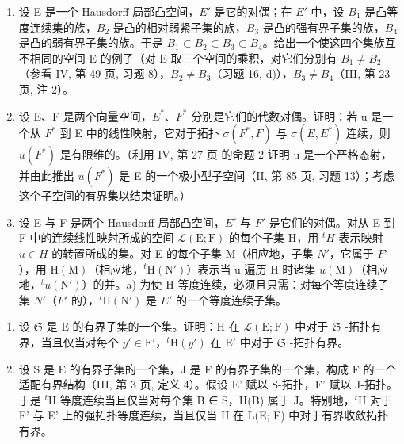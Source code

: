 \begin{enumerate}
\def\labelenumi{\arabic{enumi})}
\setcounter{enumi}{16}
\item
  设 E 是一个 Hausdorff 局部凸空间，\(E'\) 是它的对偶；在 \(E'\) 中，设 \(B_{1}\) 是凸等度连续集的族，\(B_{2}\) 是凸的相对弱紧子集的族，\(B_{3}\) 是凸的强有界子集的族，\(B_{4}\) 是凸的弱有界子集的族。于是 \(B_{1} \subset B_{2} \subset B_{3} \subset B_{4}\)。给出一个使这四个集族互不相同的空间 E 的例子（对 E 取三个空间的乘积，对它们分别有 \(B_{1} \neq B_{2}\)（参看 IV, 第 49 页, 习题 8），\(B_{2} \neq B_{3}\)（习题 16, d)），\(B_{3} \neq B_{4}\)（III, 第 23 页, 注 2）。
\item
  设 E、F 是两个向量空间，\(E^{*}\)、\(F^{*}\) 分别是它们的代数对偶。证明：若 u 是一个从 \(F^{*}\) 到 E 中的线性映射，它对于拓扑 \(\sigma(F^{*}, F)\) 与 \(\sigma(E, E^{*})\) 连续，则 \(u(F^{*})\) 是有限维的。（利用 IV, 第 27 页 的命题 2 证明 u 是一个严格态射，并由此推出 \(u(F^{*})\) 是 E 的一个极小型子空间（II, 第 85 页, 习题 13）；考虑这个子空间的有界集以结束证明。）
\item
  设 E 与 F 是两个 Hausdorff 局部凸空间，\(E'\) 与 \(F'\) 是它们的对偶。对从 E 到 F 中的连续线性映射所成的空间 \(\mathcal{L}(\mathrm{E};\mathrm{F})\) 的每个子集 H，用 \({}^{t}H\) 表示映射 \(u\in H\) 的转置所成的集。对 E 的每个子集 M（相应地，子集 \(N'\)，它属于 \(F'\)），用 \(\mathrm{H}(\mathrm{M})\)（相应地，\({}^{t}\mathrm{H}(\mathrm{N}')\)）表示当 u 遍历 H 时诸集 \(u(\mathrm{M})\)（相应地，\({}^{t}u(\mathrm{N}')\)）的并。a) 为使 H 等度连续，必须且只需：对每个等度连续子集 \(N'\)（\(F'\) 的），\({}^{t}\mathrm{H}(\mathrm{N}')\) 是 \(E'\) 的一个等度连续子集。
\end{enumerate}

\begin{enumerate}
\def\labelenumi{\alph{enumi})}
\setcounter{enumi}{1}
\item
  设 \(\mathfrak{S}\) 是 E 的有界子集的一个集。证明：H 在 \(\mathcal{L}(\mathrm{E};\mathrm{F})\) 中对于 \(\mathfrak{S}\) -拓扑有界，当且仅当对每个 \(y' \in \mathrm{F}'\)，\({}^{t}\mathrm{H}(y')\) 在 \(\mathrm{E}'\) 中对于 \(\mathfrak{S}\) -拓扑有界。
\item
  设 S 是 E 的有界子集的一个集，J 是 F 的有界子集的一个集，构成 F 的一个适配有界结构（III, 第 3 页, 定义 4）。假设 E' 赋以 S-拓扑，F' 赋以 J-拓扑。于是 \({}^{t}\mathrm{H}\) 等度连续当且仅当对每个集 B ∈ S，H(B) 属于 J。特别地，\({}^{t}\mathrm{H}\) 对于 F' 与 E' 上的强拓扑等度连续，当且仅当 H 在 L(E; F) 中对于有界收敛拓扑有界。
\end{enumerate}

